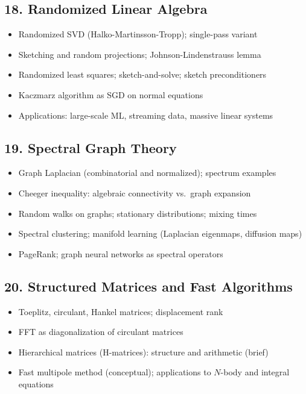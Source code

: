 \subsection{18. Randomized Linear Algebra}
\begin{itemize}
\item Randomized SVD (Halko-Martinsson-Tropp); single-pass variant
\item Sketching and random projections; Johnson-Lindenstrauss lemma
\item Randomized least squares; sketch-and-solve; sketch preconditioners
\item Kaczmarz algorithm as SGD on normal equations
\item Applications: large-scale ML, streaming data, massive linear systems
\end{itemize}

\subsection{19. Spectral Graph Theory}
\begin{itemize}
\item Graph Laplacian (combinatorial and normalized); spectrum examples
\item Cheeger inequality: algebraic connectivity vs.\ graph expansion
\item Random walks on graphs; stationary distributions; mixing times
\item Spectral clustering; manifold learning (Laplacian eigenmaps, diffusion maps)
\item PageRank; graph neural networks as spectral operators
\end{itemize}

\subsection{20. Structured Matrices and Fast Algorithms}
\begin{itemize}
\item Toeplitz, circulant, Hankel matrices; displacement rank
\item FFT as diagonalization of circulant matrices
\item Hierarchical matrices (H-matrices): structure and arithmetic (brief)
\item Fast multipole method (conceptual); applications to $N$-body and integral equations
\end{itemize}

